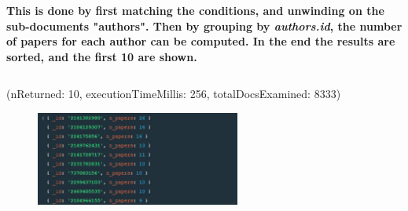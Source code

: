 \documentclass{Configuration_Files/PoliMi3i_thesis}
\begin{document}
\begin{enumerate}
    \textbf{This is done by first matching the conditions, and unwinding on the sub-documents "authors". Then by grouping by \textit{authors.id}, the number of papers for each author can be computed. In the end the results are sorted, and the first 10 are shown.}
    \inputminted[linenos,tabsize=2,breaklines]{MQL}{code/queries_mongodb/query_9.txt}
    (nReturned: 10, executionTimeMillis: 256, totalDocsExamined: 8333)
    \begin{figure}[H]
        \centering
        \includegraphics[width=0.6\textwidth]{Images/queries_mongodb/query_9.jpg}
    \end{figure}
    

\end{enumerate}
\end{document}
